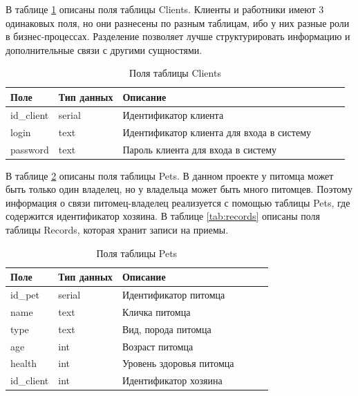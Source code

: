 В таблице \ref{tab:clients}  описаны поля таблицы Clients. Клиенты и работники имеют 3 одинаковых поля, но они разнесены по разным таблицам, ибо у них разные роли в бизнес-процессах. Разделение позволяет лучше структурировать информацию и дополнительные связи с другими сущностями.
\begin{table}[hbtp]
	\begin{center}
		\caption{\label{tab:clients}Поля таблицы Clients}
		\begin{tabular}{|l|l|l|l|l|l|}
			\hline {Поле} & {Тип данных} & {Описание}  \\ \hline
		id\_client  & serial & Идентификатор клиента   \\ \hline
		login & text & Идентификатор клиента для входа в систему \\ \hline
		password & text & Пароль клиента для входа в систему  \\ \hline
		\end{tabular}
	\end{center}
\end{table}

 В таблице \ref{tab:pets}  описаны поля таблицы Pets. В данном проекте у питомца может быть только один владелец, но у владельца может быть много питомцев. Поэтому информация о связи питомец-владелец реализуется с помощью таблицы Pets, где содержится идентификатор хозяина. В таблице \ref{tab:records}  описаны поля таблицы Records, которая хранит записи на приемы. 
 
\begin{table}[hbtp]
	\begin{center}
			\captionsetup{justification=raggedright, singlelinecheck=false}
			\caption{\label{tab:pets}Поля таблицы Pets}
		\begin{tabular}{|l|l|l|l|l|l|}
			\hline {Поле} & {Тип данных} & {Описание}  \\ \hline
			id\_pet  & serial & Идентификатор питомца   \\ \hline
			name & text & Кличка питомца \\ \hline
			type & text & Вид, порода питомца  \\ \hline
			age & int & Возраст питомца \\ \hline
			health & int & Уровень здоровья питомца  \\ \hline
			id\_client & int & Идентификатор хозяина  \\ \hline
		\end{tabular}
	\end{center}
\end{table}

